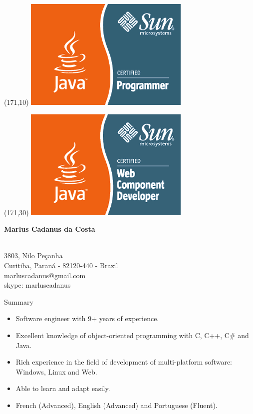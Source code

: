 \documentclass{resume}
\begin{document}
 \begin{textblock}{20}(171,10)
    \includegraphics{java-certified-programmer}
 \end{textblock}

 \begin{textblock}{20}(171,30)
    \includegraphics{java-certified-web}
 \end{textblock}

\begin{center}
  {\fontsize{16}{18} \bf Marlus Cadanus da Costa} \\\\
\end{center}
\begin{center}
  {\fontsize{12}{14} 3803, Nilo Peçanha} \\ 
  {\fontsize{12}{14} Curitiba, Paraná - 82120-440 - Brazil} \\
  {\fontsize{12}{14} marluscadanus@gmail.com} \\
  {\fontsize{12}{14} skype: marluscadanus}
\end{center}

  \begin{rSection}{Summary}
  \end{rSection}

    \begin{itemize}
       \item Software engineer with 9+ years of experience.
       \item Excellent knowledge of object-oriented programming with C, C++, C\# and Java.
       \item Rich experience in the field of development of multi-platform software: Windows, Linux and Web.
       \item Able to learn and adapt easily.
       \item French (Advanced), English (Advanced) and Portuguese (Fluent).
    \end{itemize}
\end{document}
